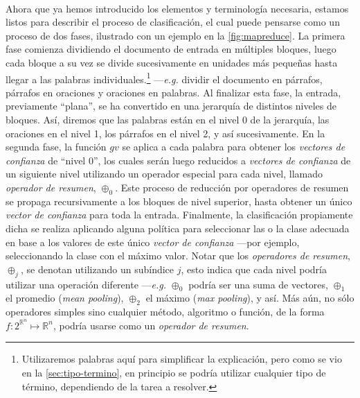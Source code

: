 \

Ahora que ya hemos introducido los elementos y terminología necesaria, estamos listos para describir el proceso de clasificación, el cual puede pensarse como un proceso de dos fases, ilustrado con un ejemplo en la \autoref{fig:mapreduce}.
La primera fase comienza dividiendo el documento de entrada en múltiples bloques, luego cada bloque a su vez se divide sucesivamente en unidades más pequeñas hasta llegar a las palabras individuales.\footnote{Utilizaremos palabras aquí para simplificar la explicación, pero como se vio en la \autoref{sec:tipo-termino}, en principio se podría utilizar cualquier tipo de término, dependiendo de la tarea a resolver.} ---\emph{e.g.} dividir el documento en párrafos, párrafos en oraciones y oraciones en palabras.
Al finalizar esta fase, la entrada, previamente ``plana'', se ha convertido en una jerarquía de distintos niveles de bloques.
Así, diremos que las palabras están en el nivel 0 de la jerarquía, las oraciones en el nivel 1, los párrafos en el nivel 2, y así sucesivamente.
En la segunda fase, la función $gv$ se aplica a cada palabra para obtener los \emph{vectores de confianza} de ``nivel 0'', los cuales serán luego reducidos a \emph{vectores de confianza} de un siguiente nivel utilizando un operador especial para cada nivel, llamado \emph{operador de resumen}, $\oplus_0$.
Este proceso de reducción por operadores de resumen se propaga recursivamente a los bloques de nivel superior, hasta obtener un único \emph{vector de confianza} para toda la entrada.
Finalmente, la clasificación propiamente dicha se realiza aplicando alguna política para seleccionar las o la clase adecuada en base a los valores de este único \emph{vector de confianza} ---por ejemplo, seleccionando la clase con el máximo valor.
Notar que los \emph{operadores de resumen}, $\oplus_j$, se denotan utilizando un subíndice $j$, esto indica que cada nivel podría utilizar una operación diferente ---\emph{e.g.} $\oplus_0$ podría ser una suma de vectores, $\oplus_1$ el promedio (\emph{mean pooling}), $\oplus_2$ el máximo (\emph{max pooling}), y así. Más aún, no sólo operadores simples sino cualquier método, algoritmo o función, de la forma $f:2^{\mathbb{R}^n}\mapsto\mathbb{R}^n$, podría usarse como un \emph{operador de resumen}.
